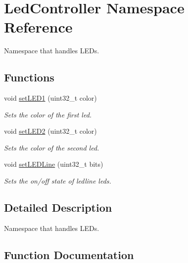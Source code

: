 \hypertarget{namespaceLedController}{}\section{Led\+Controller Namespace Reference}
\label{namespaceLedController}


Namespace that handles L\+E\+Ds.  


\subsection*{Functions}
\begin{DoxyCompactItemize}
\item 
void \mbox{\hyperlink{namespaceLedController_ac371421fafaac6a506afbbc8de099819}{set\+L\+E\+D1}} (uint32\+\_\+t color)
\begin{DoxyCompactList}\small\item\em Sets the color of the first led. \end{DoxyCompactList}\item 
void \mbox{\hyperlink{namespaceLedController_afd44909d54eb8d81b4b7340057e8beda}{set\+L\+E\+D2}} (uint32\+\_\+t color)
\begin{DoxyCompactList}\small\item\em Sets the color of the second led. \end{DoxyCompactList}\item 
void \mbox{\hyperlink{namespaceLedController_a87384dd2af9a2925e17b9f5687e366a7}{set\+L\+E\+D\+Line}} (uint32\+\_\+t bits)
\begin{DoxyCompactList}\small\item\em Sets the on/off state of ledline leds. \end{DoxyCompactList}\end{DoxyCompactItemize}


\subsection{Detailed Description}
Namespace that handles L\+E\+Ds. 

\subsection{Function Documentation}
\mbox{\label{namespaceLedController_ac371421fafaac6a506afbbc8de099819}} 
